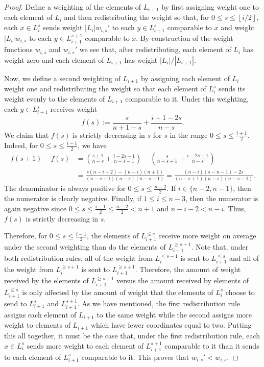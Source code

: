 \documentclass[11 pt]{article}
\theoremstyle{definition}
\theoremstyle{case}
\numberwithin{equation}{section}
\begin{document}
\begin{proof}
Define a weighting of the elements of $L_{i+1}$ by first assigning weight one to each element of $L_i$ and then redistributing the weight so that, for $0\leq s\leq \left\lfloor i/2\right\rfloor$, each $x\in L_i^s$ sends weight $|L_i|w_{i,s}'$ to each $y\in L_{i+1}^s$ comparable to $x$ and weight $|L_i|w_{i,s}$  to each $y\in L_{i+1}^{s+1}$ comparable to $x$. By construction of the weight functions $w_{i,s}$ and $w_{i,s}'$ we see that, after redistributing, each element of $L_i$ has weight zero and each element of $L_{i+1}$ has weight $|L_i|/|L_{i+1}|$.

Now, we define a second weighting of $L_{i+1}$ by assigning each element of $L_i$ weight one and redistributing the weight so that each element of $L_i^s$ sends its weight evenly to the elements of $L_{i+1}$ comparable to it. Under this weighting, each $y\in L_{i+1}^s$ receives weight
\[f(s):=\frac{s}{n+1-s} + \frac{i+1-2s}{n-s}.\]
We claim that $f(s)$ is strictly decreasing in $s$ for $s$ in the range $0\leq s\leq \frac{i+1}{2}$. Indeed, for $0\leq s\leq \frac{i-1}{2}$, we have
\begin{align*}
f(s+1)-f(s) &= \left(\frac{s+1}{n-s} + \frac{i-2s-1}{n-s-1}\right)-\left(\frac{s}{n-s+1} + \frac{i-2s+1}{n-s}\right)\\
&= \frac{s(n-i-2) - (n-i)(n+1)}{(n-s+1)(n-s)(n-s-1)}=\frac{(n-i)(s-n-1)-2s}{(n-s+1)(n-s)(n-s-1)}.\end{align*}
The denominator is always positive for $0\leq s\leq \frac{n-2}{2}$. If $i\in\{n-2,n-1\}$, then the numerator is clearly negative. Finally, if $1\leq i\leq n-3$, then the numerator is again negative since $0\leq s\leq\frac{i-1}{2} \leq \frac{n-2}{2}<n+1$ and $n-i-2<n-i$. Thus, $f(s)$ is strictly decreasing in $s$. 

Therefore, for $0\leq s\leq \frac{i-1}{2}$, the elements of $L_{i+1}^{\leq s}$ receive more weight on average under the second weighting than do the elements of $L_{i+1}^{\geq s+1}$.  Note that, under both redistribution rules, all of the weight from $L_i^{\leq s-1}$ is sent to $L_{i+1}^{\leq s}$ and all of the weight from $L_i^{\geq s+1}$ is sent to $L_{i+1}^{\geq s+1}$. Therefore, the amount of weight received by the elements of $L_{i+1}^{\geq s+1}$ versus the amount received by elements of $L_{i+1}^{\leq s}$ is only affected by the amount of weight that the elements of $L_i^s$ choose to send to $L_{i+1}^s$ and $L_{i+1}^{s+1}$. As we have mentioned, the first redistribution rule assigns each element of $L_{i+1}$ to the same weight while the second assigns more weight to elements of $L_{i+1}$ which have fewer coordinates equal to two. Putting this all together,  it must be the case that, under the first redistribution rule, each $x\in L_{i}^s$ sends more weight to each element of $L_{i+1}^{s+1}$ comparable to it than it sends to each element of $L_{i+1}^{s}$ comparable to it. This proves that $w_{i,s}' < w_{i,s}$. 
\end{proof}
\end{document}
